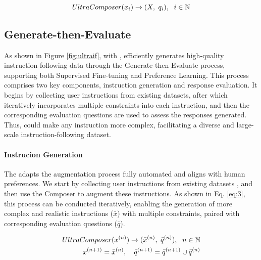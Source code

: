\begin{equation}
    \small
    \label{eq:2}
    UltraComposer(x_i) \to (X,\ q_i),\ \ i\in \mathbb{N}
\end{equation}





\subsection{Generate-then-Evaluate}
\label{sec:framework}
As shown in Figure \ref{fig:ultraif}, with \composer, \method efficiently generates high-quality instruction-following data through the Generate-then-Evaluate process, supporting both Supervised Fine-tuning and Preference Learning.
This process comprises two key components, instruction generation and response evaluation. It begins by collecting user instructions from existing datasets, after which \composer iteratively incorporates multiple constraints into each instruction, and then the corresponding evaluation questions are used to assess the responses generated. Thus, \method could make any instruction more complex, facilitating a diverse and large-scale instruction-following dataset.
 
\paragraph{Instrucion Generation}
The \composer adapts the augmentation process fully automated and aligns with human preferences. We start by collecting user instructions from existing datasets \citep{vicuna2023,OpenHermes,no_robots}, and then use the Composer to augment these instructions. As shown in Eq. \ref{eq:3}, this process can be conducted iteratively, enabling the generation of more complex and realistic instructions ($\bar{x}$) with multiple constraints, paired with corresponding evaluation questions ($\bar{q}$).

\begin{equation}
\label{eq:3}
\begin{aligned}
    \small
    UltraComposer(x^{(n)}) \to (\bar{x}^{(n)},\ \bar{q}^{(n)}),\ \ n \in \mathbb{N} \\
    x^{(n+1)} = \bar{x}^{(n)}, \quad \bar{q}^{(n+1)} = \bar{q}^{(n+1)} \cup \bar{q}^{(n)}
\end{aligned}
\end{equation}


